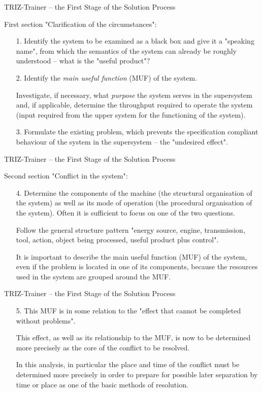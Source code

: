 \documentclass{beamer}
\begin{document}
\begin{frame}{TRIZ-Trainer -- the First Stage of the Solution Process}

First section "Clarification of the circumstances":
\begin{itemize}
\item [1.] Identify the system to be examined as a black box and give it a
  "speaking name", from which the semantics of the system can already be
  roughly understood -- what is the "useful product"?
\item [2.] Identify the \emph{main useful function} (MUF) of the system.

  Investigate, if necessary, what \emph{purpose} the system serves in the
  supersystem and, if applicable, determine the throughput required to operate
  the system (input required from the upper system for the functioning of the
  system).
\item [3.] Formulate the existing problem, which prevents the specification
  compliant behaviour of the system in the supersystem -- the "undesired
  effect". 
\end{itemize}
\end{frame}

\begin{frame}{TRIZ-Trainer -- the First Stage of the Solution Process}
  
Second section "Conflict in the system": 
\begin{itemize}
\item[4.] Determine the components of the machine (the structural organisation
  of the system) as well as its mode of operation (the procedural organisation
  of the system).  Often it is sufficient to focus on one of the two
  questions.

  Follow the general structure pattern "energy source, engine, transmission,
  tool, action, object being processed, useful product plus control".
  
  It is important to describe the main useful function (MUF) of the system,
  even if the problem is located in one of its components, because the
  resources used in the system are grouped around the MUF.
\end{itemize}
\end{frame}

\begin{frame}{TRIZ-Trainer -- the First Stage of the Solution Process}
  
\begin{itemize}
\item [5.] This MUF is in some relation to the "effect that cannot be
  completed without problems".

  This effect, as well as its relationship to the MUF, is now to be determined
  more precisely as the core of the conflict to be resolved.

  In this analysis, in particular the place and time of the conflict must be
  determined more precisely in order to prepare for possible later separation
  by time or place as one of the basic methods of resolution.
\end{itemize}
\end{frame}
\end{document}
